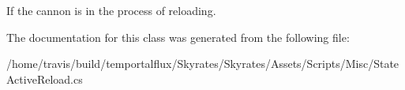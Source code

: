 If the cannon is in the process of reloading. 



The documentation for this class was generated from the following file\-:\begin{DoxyCompactItemize}
\item 
/home/travis/build/temportalflux/\-Skyrates/\-Skyrates/\-Assets/\-Scripts/\-Misc/State\-Active\-Reload.\-cs\end{DoxyCompactItemize}
